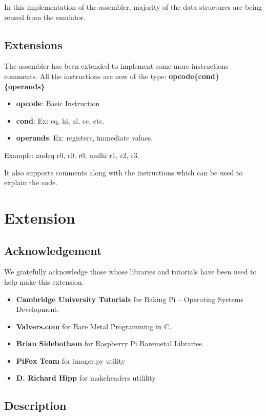 \documentclass[11pt]{article}
\begin{document}
In this implementation of the assembler, majority of the data structures are
being reused from the emulator.

\subsection{Extensions}

The assembler has been extended to implement some more instructions comments.
All the instructions are now of the type:
\textbf{opcode\{cond\} \{operands\}}
\begin{itemize}[noitemsep,topsep=0pt]
  \item \textbf{opcode}: Basic Instruction
  \item \textbf{cond}: Ex: eq, hi, al, cc, etc.
  \item \textbf{operands}: Ex: registers, immediate values.
\end{itemize}
Example: andeq r0, r0, r0, mulhi r1, r2, r3.

It also supports comments along with the instructions which can be used to
explain the code.

\section{Extension}

\subsection{Acknowledgement}

We gratefully acknowledge those  whose libraries and tutorials have been used
to help make this extension.

\begin{itemize}[noitemsep,topsep=0pt]
  \item \textbf{Cambridge University Tutorials} for Baking Pi –
    Operating Systems Development.
  \item \textbf{Valvers.com} for Bare Metal Programming in C.
  \item \textbf{Brian Sidebotham} for Raspberry Pi Baremetal Libraries.
  \item \textbf{PiFox Team} for imager.py utility
  \item \textbf{D. Richard Hipp} for makeheaders utilility
\end{itemize}

\subsection{Description}
\end{document}
